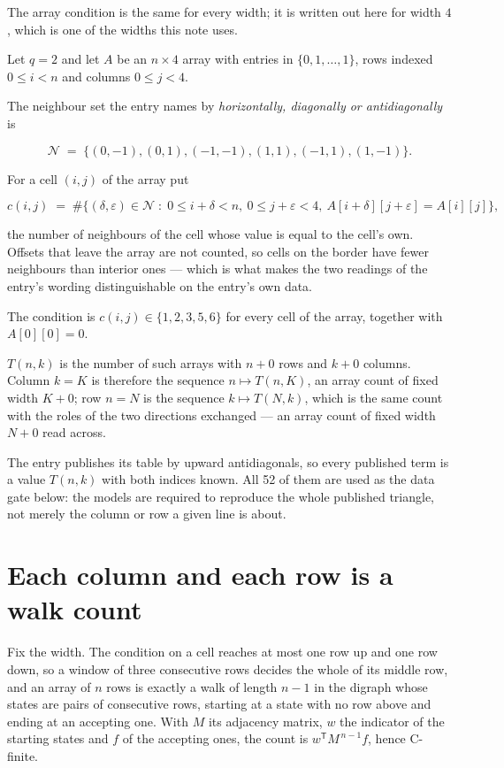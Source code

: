 \documentclass[11pt]{article}
\theoremstyle{definition}
\begin{document}
The array condition is the same for every width; it is written out here for width $4$, which is one of the widths this note uses.

Let $q = 2$ and let $A$ be an $n \times 4$ array with entries in $\{0,1,\dots,1\}$, rows indexed $0 \le i < n$ and columns $0 \le j < 4$.

The neighbour set the entry names by {\itshape horizontally, diagonally or antidiagonally} is

\[\mathcal{N} \;=\; \{(0,-1), (0,1), (-1,-1), (1,1), (-1,1), (1,-1)\}.\]

For a cell $(i,j)$ of the array put

\[c(i,j) \;=\; \#\bigl\{(\delta,\varepsilon)\in\mathcal{N} \;:\; 0\le i+\delta<n,\ 0\le j+\varepsilon<4,\ A[i+\delta][j+\varepsilon] = A[i][j]\bigr\},\]

the number of neighbours of the cell whose value is equal to the cell's own. Offsets that leave the array are not counted, so cells on the border have fewer neighbours than interior ones --- which is what makes the two readings of the entry's wording distinguishable on the entry's own data.

The condition is $c(i,j) \in \{1, 2, 3, 5, 6\}$ for every cell of the array, together with $A[0][0]=0$.

$T(n,k)$ is the number of such arrays with $n + 0$ rows and $k + 0$ columns. Column $k = K$ is therefore the sequence $n \mapsto T(n,K)$, an array count of fixed width $K + 0$; row $n = N$ is the sequence $k \mapsto T(N,k)$, which is the same count with the roles of the two directions exchanged --- an array count of fixed width $N + 0$ read across.

The entry publishes its table by upward antidiagonals, so every published term is a value $T(n,k)$ with both indices known. All 52 of them are used as the data gate below: the models are required to reproduce the whole published triangle, not merely the column or row a given line is about.

\section{Each column and each row is a walk count}

Fix the width. The condition on a cell reaches at most one row up and one row down, so a window of three consecutive rows decides the whole of its middle row, and an array of $n$ rows is exactly a walk of length $n-1$ in the digraph whose states are pairs of consecutive rows, starting at a state with no row above and ending at an accepting one. With $M$ its adjacency matrix, $w$ the indicator of the starting states and $f$ of the accepting ones, the count is $w^{\mathsf T}M^{\,n-1}f$, hence C-finite.
\end{document}
